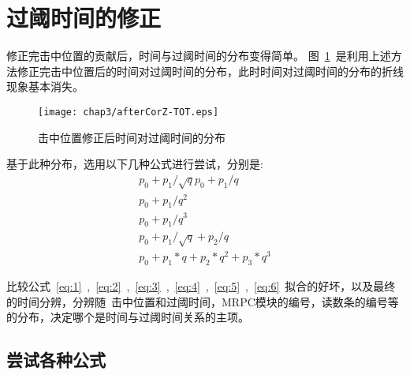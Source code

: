 \section{过阈时间的修正}
修正完击中位置的贡献后，时间与过阈时间的分布变得简单。
图~\ref{fig:afterCorZ-TOT}~是利用上述方法修正完击中位置后的时间对过阈时间的分布，此时时间对过阈时间的分布的折线现象基本消失。

\begin{figure}[htbp]
\centering
\texttt{[image: chap3/afterCorZ-TOT.eps]}
\caption{击中位置修正后时间对过阈时间的分布}
\label{fig:afterCorZ-TOT}
\end{figure}

基于此种分布，选用以下几种公式进行尝试，分别是:
\begin{align}
p_{0}+p_{1}/\sqrt{q}
\label{eq:1}
p_{0}+p_{1}/q
\label{eq:2}\\
p_{0}+p_{1}/q^{2}
\label{eq:3}\\
p_{0}+p_{1}/q^{3}
\label{eq:4}\\
p_{0}+p_{1}/\sqrt{q}+p_{2}/q
\label{eq:5}\\
p_{0}+p_{1}*q+p_{2}*q^{2}+p_{3}*q^3
\label{eq:6}    
\end{align}

比较公式~\ref{eq:1}~,~\ref{eq:2}~,~\ref{eq:3}~,~\ref{eq:4}~,~\ref{eq:5}~,~\ref{eq:6}~拟合的好坏，以及最终的时间分辨，分辨随~击中位置和过阈时间，MRPC模块的编号，读数条的编号等的分布，决定哪个是时间与过阈时间关系的主项。

\subsection{尝试各种公式}

